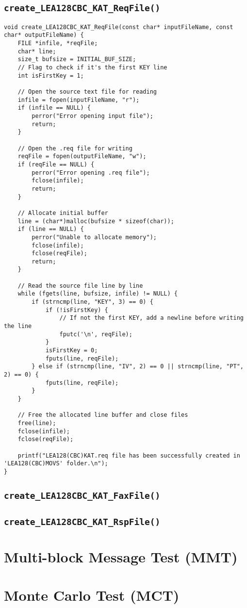 \subsection{\texttt{create\_LEA128CBC\_KAT\_ReqFile()}}
\begin{lstlisting}[style=C]
void create_LEA128CBC_KAT_ReqFile(const char* inputFileName, const char* outputFileName) {
	FILE *infile, *reqFile;
	char* line;
	size_t bufsize = INITIAL_BUF_SIZE;
	// Flag to check if it's the first KEY line
	int isFirstKey = 1; 
	
	// Open the source text file for reading
	infile = fopen(inputFileName, "r");
	if (infile == NULL) {
		perror("Error opening input file");
		return;
	}
	
	// Open the .req file for writing
	reqFile = fopen(outputFileName, "w");
	if (reqFile == NULL) {
		perror("Error opening .req file");
		fclose(infile);
		return;
	}
	
	// Allocate initial buffer
	line = (char*)malloc(bufsize * sizeof(char));
	if (line == NULL) {
		perror("Unable to allocate memory");
		fclose(infile);
		fclose(reqFile);
		return;
	}
	
	// Read the source file line by line
	while (fgets(line, bufsize, infile) != NULL) {
		if (strncmp(line, "KEY", 3) == 0) {
			if (!isFirstKey) {
				// If not the first KEY, add a newline before writing the line
				fputc('\n', reqFile);
			}
			isFirstKey = 0;
			fputs(line, reqFile);
		} else if (strncmp(line, "IV", 2) == 0 || strncmp(line, "PT", 2) == 0) {
			fputs(line, reqFile);
		}
	}
	
	// Free the allocated line buffer and close files
	free(line);
	fclose(infile);
	fclose(reqFile);
	
	printf("LEA128(CBC)KAT.req file has been successfully created in 'LEA128(CBC)MOVS' folder.\n");
}
\end{lstlisting}


\subsection{\texttt{create\_LEA128CBC\_KAT\_FaxFile()}}
\subsection{\texttt{create\_LEA128CBC\_KAT\_RspFile()}}

\section{Multi-block Message Test (MMT)}
\section{Monte Carlo Test (MCT)}